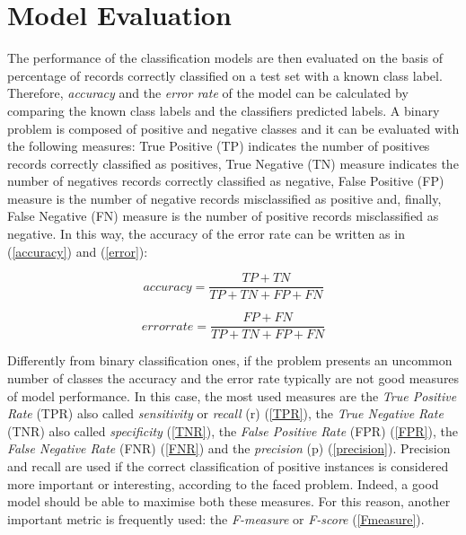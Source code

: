 \documentclass[final,a4paper,12pt,english]{UnicaPhdThesis3}
\begin{document}
\section{Model Evaluation} \label{ME} %
The performance of the classification models are then evaluated on the basis of percentage of records correctly classified on a test set with a known class label. Therefore, \textit{accuracy} and the \textit{error rate} of the model can be calculated by comparing the known class labels and the classifiers predicted labels. A binary problem is composed of positive and negative classes and it can be evaluated with the following measures: True Positive (\acs{TP}) indicates the number of positives records correctly classified as positives, True Negative (\acs{TN}) measure indicates the number of negatives records correctly classified as negative, False Positive (\acs{FP}) measure is the number of negative records misclassified as positive and, finally, False Negative (\acs{FN}) measure is the number of positive records misclassified as negative. In this way, the accuracy of the error rate can be written as in (\ref{accuracy}) and (\ref{error}):

\begin{equation}\label{accuracy}
accuracy= \frac{TP + TN}{TP + TN + FP + FN}	
\end{equation}

\begin{equation}\label{error}
error rate= \frac{FP + FN}{TP + TN + FP + FN}	
\end{equation}

Differently from binary classification ones, if the problem presents an uncommon number of classes the accuracy and the error rate typically are not good measures of model performance. In this case, the most used measures are the \textit{True Positive Rate} (\acs{TPR}) also called \textit{sensitivity} or \textit{recall} (r) (\ref{TPR}), the \textit{True Negative Rate} (\acs{TNR}) also called \textit{specificity} (\ref{TNR}), the \textit{False Positive Rate} (\acs{FPR}) (\ref{FPR}), the \textit{False Negative Rate} (\acs{FNR}) (\ref{FNR}) and the \textit{precision} (p) (\ref{precision}). Precision and recall are used if the correct classification of positive instances is considered more important or interesting, according to the faced problem. Indeed, a good model should be able to maximise both these measures. For this reason, another important metric is frequently used: the \textit{F-measure} or \textit{F-score} (\ref{Fmeasure}).
\end{document}
